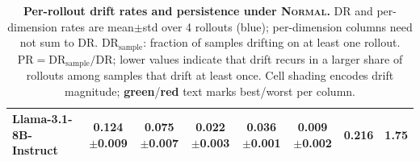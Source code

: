 \begin{table}[t]
{\begin{tabular}{l c c c c c c c}
Llama-3.1-8B-Instruct            & 0.124 {\color{blue}\scriptsize $\pm$0.009} & \cellcolor{red!4}0.075 {\color{blue}\scriptsize $\pm$0.007} & \cellcolor{green!8}0.022 {\color{blue}\scriptsize $\pm$0.003} & \cellcolor{red!4}0.036 {\color{blue}\scriptsize $\pm$0.001} & \cellcolor{green!8}0.009 {\color{blue}\scriptsize $\pm$0.002} & 0.216 & 1.75 \\
\bottomrule
\end{tabular}%
}

\caption{\textbf{Per-rollout drift rates and persistence under \textsc{Normal}.} DR and per-dimension rates are mean$\pm$std over 4 rollouts (blue); per-dimension columns need not sum to DR. $\mathrm{DR}_{\mathrm{sample}}$: fraction of samples drifting on at least one rollout. $\mathrm{PR}=\mathrm{DR}_{\mathrm{sample}}/\mathrm{DR}$; lower values indicate that drift recurs in a larger share of rollouts among samples that drift at least once. Cell shading encodes drift magnitude; {\color{ForestGreen}\textbf{green}}/{\color{BrickRed}\textbf{red}} text marks best/worst per column.}
\label{tab:persistence}
\vspace{-4mm}
\end{table}
